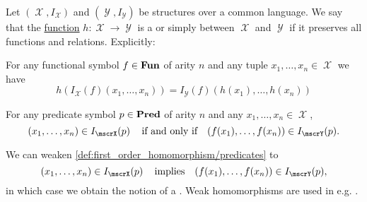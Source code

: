 \begin{definition}\label{def:first_order_homomorphism}
  Let \( (\mscrX, I_{\mscrX}) \) and \( (\mscrY, I_{\mscrY}) \) be structures over a common language. We say that the \hyperref[def:function]{function} \( h: \mscrX \to \mscrY \) is a  or simply  between \( \mscrX \) and \( \mscrY \) if it preserves all functions and relations. Explicitly:
  \begin{thmenum}
     For any functional symbol \( f \in \operatorname{\mathbf{Fun}} \) of arity \( n \) and any tuple \( x_1, \ldots, x_n \in \mscrX \) we have
    \begin{equation}\label{eq:def:first_order_homomorphism/functions}
      h(I_{\mscrX}(f)(x_1, \ldots, x_n)) = I_{\mscrY}(f)(h(x_1), \ldots, h(x_n))
    \end{equation}

     For any predicate symbol \( p \in \operatorname{\mathbf{Pred}} \) of arity \( n \) and any \( x_1, \ldots, x_n \in \mscrX \),
    \begin{equation}\label{eq:def:first_order_homomorphism/predicates}
      (x_1, \ldots, x_n) \in I_{\mscrX}(p) \quad\T{if and only if}\quad (f(x_1), \ldots, f(x_n)) \in I_{\mscrY}(p).
    \end{equation}

     We can weaken \ref{def:first_order_homomorphism/predicates} to
    \begin{equation}\label{eq:def:first_order_homomorphism/predicates_weak}
      (x_1, \ldots, x_n) \in I_{\mscrX}(p) \quad\T{implies}\quad (f(x_1), \ldots, f(x_n)) \in I_{\mscrY}(p),
    \end{equation}
    in which case we obtain the notion of a . Weak homomorphisms are used in e.g. .
  \end{thmenum}
\end{definition}

